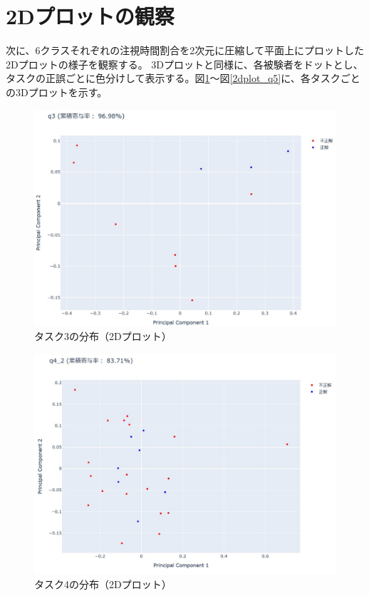 \documentclass[paper=a4paper,fontsize=11pt]{jlreq}
\begin{document}
    \pagebreak

    \section{2Dプロットの観察}
    次に、6クラスそれぞれの注視時間割合を2次元に圧縮して平面上にプロットした2Dプロットの様子を観察する。
    3Dプロットと同様に、各被験者をドットとし、タスクの正誤ごとに色分けして表示する。図\ref{2dplot_q3}～図\ref{2dplot_q5}に、各タスクごとの3Dプロットを示す。
    \begin{figure}[htbp]
      \centering
      \includegraphics[width=0.8\linewidth]{2dplot_q3.jpg}
      \caption{タスク3の分布（2Dプロット）}
      \label{2dplot_q3}
    \end{figure}
    \FloatBarrier
    \begin{figure}[htbp]
      \centering
      \includegraphics[width=0.8\linewidth]{2dplot_q4_2.jpg}
      \caption{タスク4の分布（2Dプロット）}
      \label{2dplot_q4_2}
    \end{figure}
    \FloatBarrier
\end{document}
